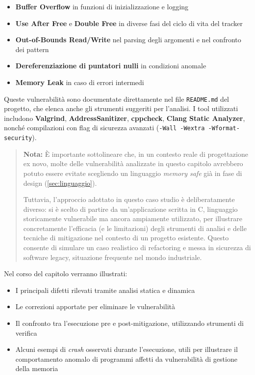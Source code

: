 \begin{itemize}
  \item \textbf{Buffer Overflow} in funzioni di inizializzazione e logging

  \item \textbf{Use After Free} e \textbf{Double Free} in diverse fasi del ciclo
    di vita del tracker

  \item \textbf{Out-of-Bounds Read/Write} nel parsing degli argomenti e nel
    confronto dei pattern

  \item \textbf{Dereferenziazione di puntatori nulli} in condizioni anomale

  \item \textbf{Memory Leak} in caso di errori intermedi
\end{itemize}

Queste vulnerabilità sono documentate direttamente nel file \texttt{README.md} del
progetto, che elenca anche gli strumenti suggeriti per l'analisi. I tool utilizzati
includono \textbf{Valgrind}, \textbf{AddressSanitizer}, \textbf{cppcheck}, \textbf{Clang
Static Analyzer}, nonché compilazioni con flag di sicurezza avanzati (\texttt{-Wall
-Wextra -Wformat-security}).

\begin{quote}
  \textbf{Nota:} È importante sottolineare che, in un contesto reale di progettazione
  ex novo, molte delle vulnerabilità analizzate in questo capitolo avrebbero
  potuto essere evitate scegliendo un linguaggio \textit{memory safe} già in fase
  di design (\autoref{sec:linguaggio}).

  Tuttavia, l'approccio adottato in questo caso studio è deliberatamente diverso:
  si è scelto di partire da un'applicazione scritta in C, linguaggio
  storicamente vulnerabile ma ancora ampiamente utilizzato, per illustrare concretamente
  l'efficacia (e le limitazioni) degli strumenti di analisi e delle tecniche di mitigazione
  nel contesto di un progetto esistente. Questo consente di simulare un caso
  realistico di refactoring e messa in sicurezza di software legacy, situazione frequente
  nel mondo industriale.
\end{quote}

Nel corso del capitolo verranno illustrati:
\begin{itemize}
  \item I principali difetti rilevati tramite analisi statica e dinamica

  \item Le correzioni apportate per eliminare le vulnerabilità

  \item Il confronto tra l'esecuzione pre e post-mitigazione, utilizzando
    strumenti di verifica

  \item Alcuni esempi di \textit{crash} osservati durante l'esecuzione, utili per
    illustrare il comportamento anomalo di programmi affetti da vulnerabilità di
    gestione della memoria
\end{itemize}

